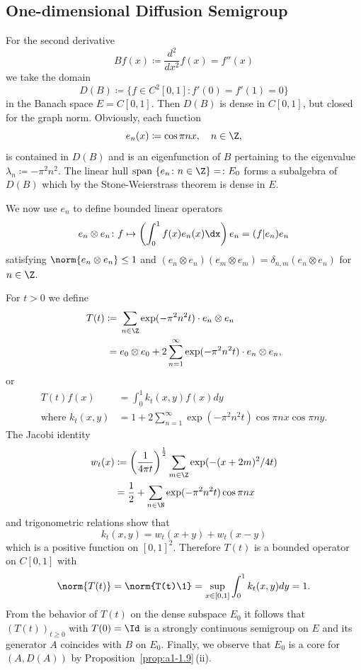 \subsection{One-dimensional Diffusion Semigroup}\label{subsec:a1-2.7}%
For the second derivative 
\[
    Bf(x) \coloneqq \frac{d^{2}}{dx^{2}}f(x) = f''(x)
\]
we take the domain
\[
    D(B) \coloneqq \{f \in C^{2}\left[ 0,1 \right] \colon f'(0) = f'(1) = 0\}
\]
in the Banach space $E = C\left[ 0,1 \right]$.
Then $D(B)$ is dense in $C\left[ 0,1 \right]$, but closed for the graph norm.
Obviously, each function
\[
    e_{n}(x) \coloneqq \cos \pi nx, \quad n \in \Z,
\]
is contained in $D(B)$ and is an eigenfunction of\/ $B$ pertaining to the eigenvalue $\lambda_{n} \coloneqq -\pi^{2}n^{2}$.
The linear hull $\text{span }\{e_{n} \colon n \in \Z\} = \colon E_{0}$ forms a subalgebra of\/ $D(B)$ which by the Stone-Weierstrass theorem is dense in $E$.

We now use $e_{n}$ to define bounded linear operators 
\[
	e_{n} \otimes e_{n} \colon f \mapsto \left(\int_{0}^{1} f(x)e_{n}(x) \dx \right)e_{n} 
		= ( f | e_{n} ) e_{n} %
\]
satisfying $\norm{e_{n} \otimes e_{n}} \leq 1$ and
$(e_{n} \otimes e_{n})(e_{m} \otimes e_{m}) = \delta_{n,m}(e_{n} \otimes e_{n})$ for $n \in \Z$.

For $t > 0$ we define
\begin{align*}
T(t) \coloneqq{}& \sum_{n \in \Z} \exp(-\pi^{2}n^{2}t) \cdot e_{n} \otimes e_{n} \\
		={}& e_{0} \otimes e_{0} + 2\sum_{n=1}^{\infty} \exp(-\pi^{2}n^{2}t) \cdot e_{n} \otimes e_{n},
\end{align*}
or
\begin{align*}
    T(t)f(x) &= \int_{0}^{1} k_{t}(x,y)f(x)dy \\
    \text{where } k_{t}(x,y) &= 1 + 2\sum_{n=1}^{\infty} \exp(-\pi^{2}n^{2}t) \cos\pi nx \cos\pi ny .
\end{align*}
The Jacobi identity
\begin{align*}
    w_{t}(x) &\coloneqq \left( \frac{1}{4\pi t}\right)^{\frac{1}{2}} \sum_{m \in \Z} \exp(-(x+2m)^{2}/4t) \\
    &= \frac{1}{2} + \sum_{n \in \N} \exp(-\pi^{2}n^{2}t) \cos\pi nx
\end{align*}
and trigonometric relations show that
\[
    k_{t}(x,y) = w_{t}(x+y) + w_{t}(x-y)
\]
which is a positive function on $\left[ 0,1 \right]^{2}$.
Therefore $T(t)$ is a bounded operator on $C\left[ 0,1 \right]$ with
\[
    \norm{T(t)} = \norm{T(t)\1} = \sup_{x \in \left[ 0,1 \right]} \int_{0}^{1} k_{t}(x,y)dy = 1 .
\]
From the behavior of\/ $T(t)$ on the dense subspace $E_{0}$ it follows that $(T(t))_{t \geq 0}$ with $T(0) = \Id$ is a strongly continuous semigroup on $E$ and its generator $A$ coincides with $B$ on $E_{0}$.
Finally, we observe that $E_{0}$ is a core for $(A,D(A))$ by Proposition~\ref{prop:a1-1.9}\,(ii).

